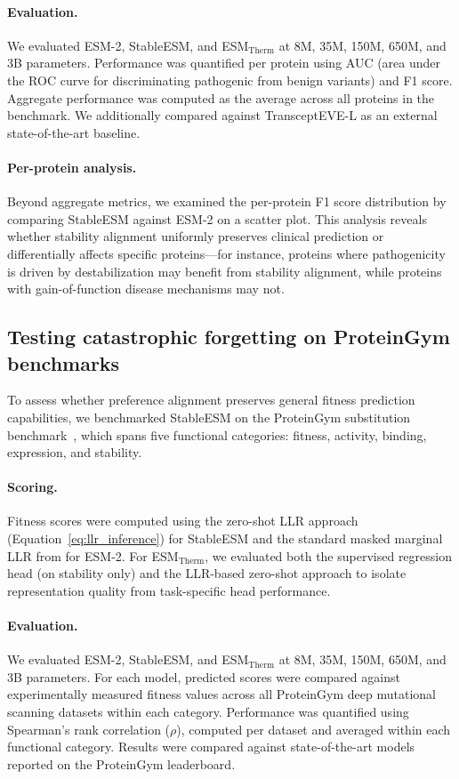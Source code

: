 \paragraph{Evaluation.}
We evaluated ESM-2, StableESM, and ESM$_{\text{Therm}}$ at 8M, 35M, 150M, 650M, and 3B parameters.
Performance was quantified per protein using AUC (area under the ROC curve for discriminating pathogenic from benign variants) and F1 score.
Aggregate performance was computed as the average across all proteins in the benchmark.
We additionally compared against TransceptEVE-L as an external state-of-the-art baseline.

\paragraph{Per-protein analysis.}
Beyond aggregate metrics, we examined the per-protein F1 score distribution by comparing StableESM against ESM-2 on a scatter plot.
This analysis reveals whether stability alignment uniformly preserves clinical prediction or differentially affects specific proteins---for instance, proteins where pathogenicity is driven by destabilization may benefit from stability alignment, while proteins with gain-of-function disease mechanisms may not.

\subsection{Testing catastrophic forgetting on ProteinGym benchmarks}\label{sec:proteingym_forgetting}

To assess whether preference alignment preserves general fitness prediction capabilities, we benchmarked StableESM on the ProteinGym substitution benchmark~\citep{notin2023proteingym}, which spans five functional categories: fitness, activity, binding, expression, and stability.

\paragraph{Scoring.}
Fitness scores were computed using the zero-shot LLR approach (Equation~\ref{eq:llr_inference}) for StableESM and the standard masked marginal LLR from \citet{meier2021language} for ESM-2.
For ESM$_{\text{Therm}}$, we evaluated both the supervised regression head (on stability only) and the LLR-based zero-shot approach to isolate representation quality from task-specific head performance.

\paragraph{Evaluation.}
We evaluated ESM-2, StableESM, and ESM$_{\text{Therm}}$ at 8M, 35M, 150M, 650M, and 3B parameters.
For each model, predicted scores were compared against experimentally measured fitness values across all ProteinGym deep mutational scanning datasets within each category.
Performance was quantified using Spearman’s rank correlation ($\rho$), computed per dataset and averaged within each functional category.
Results were compared against state-of-the-art models reported on the ProteinGym leaderboard.

